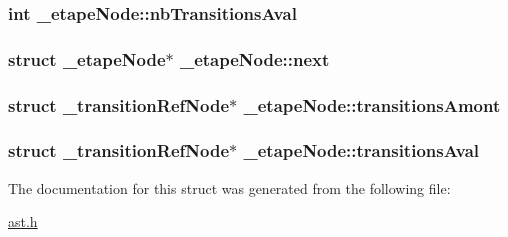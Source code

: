\subsubsection[{\texorpdfstring{nb\+Transitions\+Aval}{nbTransitionsAval}}]{\setlength{\rightskip}{0pt plus 5cm}int \+\_\+etape\+Node\+::nb\+Transitions\+Aval}\hypertarget{struct__etapeNode_ad66d5f8cf9aa988a9f4e93ba54ace1aa}{}\label{struct__etapeNode_ad66d5f8cf9aa988a9f4e93ba54ace1aa}
\subsubsection[{\texorpdfstring{next}{next}}]{\setlength{\rightskip}{0pt plus 5cm}struct {\bf \+\_\+etape\+Node}$\ast$ \+\_\+etape\+Node\+::next}\hypertarget{struct__etapeNode_a73067713dc0dbd54c48499c76e75ad5f}{}\label{struct__etapeNode_a73067713dc0dbd54c48499c76e75ad5f}
\subsubsection[{\texorpdfstring{transitions\+Amont}{transitionsAmont}}]{\setlength{\rightskip}{0pt plus 5cm}struct {\bf \+\_\+transition\+Ref\+Node}$\ast$ \+\_\+etape\+Node\+::transitions\+Amont}\hypertarget{struct__etapeNode_a09d6998355aa6ba3e9d48b1160b2d40e}{}\label{struct__etapeNode_a09d6998355aa6ba3e9d48b1160b2d40e}
\subsubsection[{\texorpdfstring{transitions\+Aval}{transitionsAval}}]{\setlength{\rightskip}{0pt plus 5cm}struct {\bf \+\_\+transition\+Ref\+Node}$\ast$ \+\_\+etape\+Node\+::transitions\+Aval}\hypertarget{struct__etapeNode_a0d8711116aefef2182d1cb840317fcff}{}\label{struct__etapeNode_a0d8711116aefef2182d1cb840317fcff}


The documentation for this struct was generated from the following file\+:\begin{DoxyCompactItemize}
\item 
\hyperlink{ast_8h}{ast.\+h}\end{DoxyCompactItemize}
